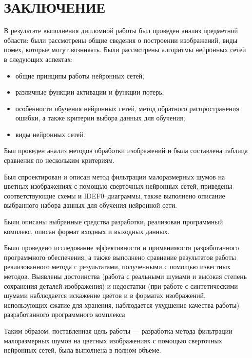 \chapter*{ЗАКЛЮЧЕНИЕ}

В результате выполнения дипломной работы был проведен анализ предметной области: были рассмотрены общие сведения о построении изображений, виды помех, которые могут возникать. Были рассмотрены алгоритмы нейронных сетей в следующих аспектах:
\begin{itemize}
    \item общие принципы работы нейронных сетей;
    \item различные функции активации и функции потерь;
    \item особенности обучения нейронных сетей, метод обратного распространения ошибки, а также критерии выбора данных для обучения;
    \item виды нейронных сетей.
\end{itemize}

Был проведен анализ методов обработки изображений и была составлена таблица сравнения по нескольким критериям.

Был спроектирован и описан метод фильтрации малоразмерных шумов на цветных изображениях с помощью сверточных нейронных сетей, приведены соответствующие схемы и IDEF0--диаграммы, также выполнено описание выбранного набора данных для обучения нейронной сети. 

Были описаны выбранные средства разработки, реализован программный комплекс, описан формат входных и выходных данных.

Было проведено исследование эффективности и применимости разработанного программного обеспечения, а также выполнено сравнение результатов работы реализованного метода с результатами, полученными с помощью известных методов. Выявлены достоинства (работа с реальными шумами и высокая степень сохранения деталей изображения) и недостатки (при работе с синтетическими шумами наблюдается искажение цветов и в форматах изображений, использующих сжатие для хранения, наблюдается ухудшение качества работы) разработанного программного комплекса

Таким образом, поставленная цель работы --- разработка метода фильтрации малоразмерных шумов на цветных изображениях с помощью сверточных нейронных сетей, была выполнена в полном объеме.